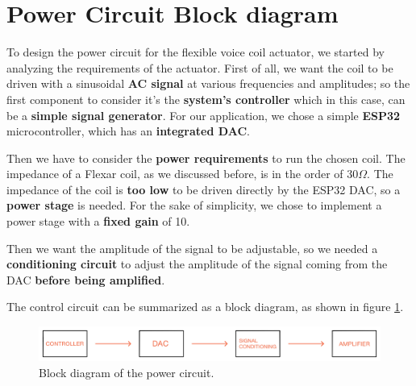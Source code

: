 \section{Power Circuit Block diagram}

To design the power circuit for the flexible voice coil actuator, we started by analyzing the requirements of the actuator.
First of all, we want the coil to be driven with a sinusoidal \textbf{AC signal} at various frequencies and amplitudes; so the first component to consider it's the \textbf{system's controller} which in this case, can be a \textbf{simple signal generator}.
For our application, we chose a simple \textbf{ESP32} microcontroller, which has an \textbf{integrated DAC}.
\bigskip

Then we have to consider the \textbf{power requirements} to run the chosen coil.
The impedance of a Flexar coil, as we discussed before, is in the order of 30$\Omega$.
The impedance of the coil is \textbf{too low} to be driven directly by the ESP32 DAC, so a \textbf{power stage} is needed.
For the sake of simplicity, we chose to implement a power stage with a \textbf{fixed gain} of 10.
\bigskip

Then we want the amplitude of the signal to be adjustable, so we needed a \textbf{conditioning circuit} to adjust the amplitude of the signal coming from the DAC \textbf{before being amplified}.
\bigskip

The control circuit can be summarized as a block diagram, as shown in figure \ref{fig: Power_Circuit_Block_Diagram}.
\begin{figure}[H]
    \centering
    \includegraphics[width=1\linewidth]{Chapters/Chapter4/Figures/power_circuit_block_diagram.jpg}
    \caption{Block diagram of the power circuit.}
    \label{fig: Power_Circuit_Block_Diagram}    
\end{figure}

\pagebreak